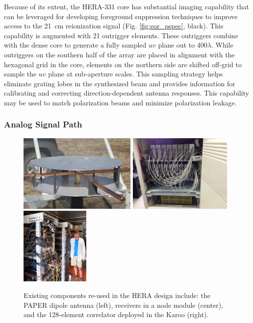 \documentclass[preprint]{aastex}
\newcommand{\compress}{\vspace{-0.3in}}
\begin{document}
Because of its extent, the HERA-331 core has substantial
imaging capability that can be leveraged for developing foreground suppression techniques
to improve access to the 21~cm reionization signal 
(Fig. \ref{fig:eor_pspec}, black).
This capability is augmented with 21 outrigger elements.  These outriggers
combine with the dense core to generate a fully
sampled $uv$ plane out to 400$\lambda$.  While outriggers on the southern half of the array are
placed in alignment with the hexagonal grid in the core, elements on the northern side are
shifted off-grid to sample the $uv$ plane at sub-aperture scales.
This sampling strategy helps eliminate grating lobes in the
synthesized beam and provides information for
calibrating and correcting direction-dependent antenna responses.  This capability may
be used to match polarization beams and minimize
polarization leakage.


\compress
\subsubsection{Analog Signal Path}
\vspace{-6pt}

\begin{figure}[t]
    \centering
        \includegraphics[height=1.5in]{plots/new_antenna_closeup.jpg}
        \includegraphics[height=1.5in]{plots/Engineering/recv_node.png}
        \includegraphics[height=1.5in]{plots/Engineering/digital.png}
    \caption{\small
    Existing components re-used in the HERA design include:
    the PAPER dipole antenna (left), 
    receivers in a node module (center), and
    the 128-element correlator deployed in the Karoo (right).
}\label{fig:components}
\end{figure}
\end{document}
